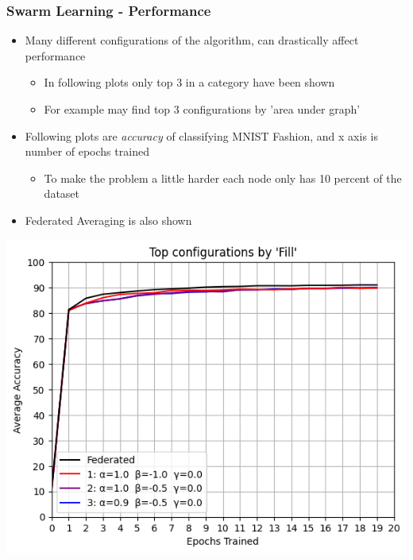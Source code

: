 \documentclass{beamer}
\begin{document}
	\begin{frame}
		\frametitle{Swarm Learning - Performance}
		\begin{itemize}
			\item Many different configurations of the algorithm, can drastically affect performance
			\begin{itemize}
				\item In following plots only top 3 in a category have been shown
				\item For example may find top 3 configurations by 'area under graph'
			\end{itemize}
			\item Following plots are \emph{accuracy} of classifying MNIST Fashion, and x axis is number of epochs trained
			\begin{itemize}
				\item To make the problem a little harder each node only has 10 percent of the dataset
			\end{itemize}
			\item Federated Averaging is also shown
		\end{itemize}
	\end{frame}

	\begin{frame}
		\includegraphics[width = \textwidth]{fill}
	\end{frame}
\end{document}
